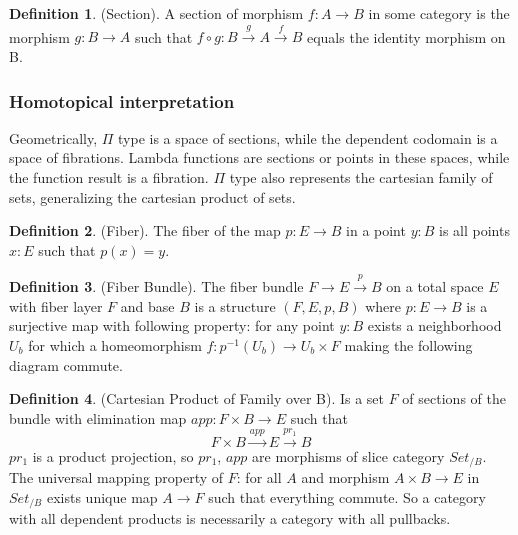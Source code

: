 \documentclass[twocolumn,10pt]{article}
\theoremstyle{definition}
\newtheorem{definition}{Definition}
\def\mapright#1{\xrightarrow{{#1}}}
\begin{document}
\begin{definition} (Section).
A section of morphism $f: A \rightarrow B$ in some category is the morphism $g: B \rightarrow A$
such that $f \circ g: B \mapright{g} A \mapright{f} B$ equals the identity morphism on B.
\end{definition}

\subsubsection*{Homotopical interpretation}

Geometrically, $\Pi$ type is a space of sections, while the dependent codomain is a space of fibrations.
Lambda functions are sections or points in these spaces, while the function result is a fibration.
$\Pi$ type also represents the cartesian family of sets, generalizing the cartesian product of sets.

\begin{definition} (Fiber).
The fiber of the map $p: E \rightarrow B$ in a point $y: B$ is all points $x: E$ such that $p(x)=y$.
\end{definition}

\begin{definition} (Fiber Bundle).
The fiber bundle $ F \rightarrow E \mapright{p} B$ on a total space $E$ with fiber layer $F$ and base $B$ is a
structure $(F,E,p,B)$ where $p: E \rightarrow B$ is a surjective map with following property:
for any point $y: B$ exists a neighborhood $U_b$ for which a homeomorphism $f: p^{-1}(U_b) \rightarrow U_b \times F$
making the following diagram commute.
\begin{center}
\end{center}
\end{definition}

\begin{definition} (Cartesian Product of Family over B).
Is a set $F$ of sections of the bundle with elimination map $app : F \times B \rightarrow E$ such that
\begin{equation}
F \times B \mapright{app} E \mapright{pr_1} B
\end{equation}
$pr_1$ is a product projection, so $pr_1$, $app$ are morphisms
of slice category $Set_{/B}$. The universal mapping property of $F$:
for all $A$ and morphism $A \times B \rightarrow E$ in $Set_{/B}$ exists
unique map $A \rightarrow F$ such that everything commute. So a category
with all dependent products is necessarily a category with all pullbacks.
\end{definition}
\end{document}
